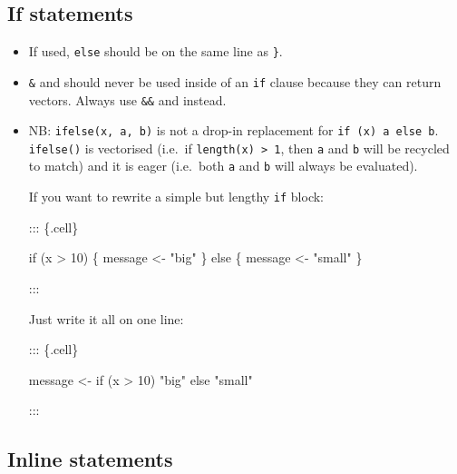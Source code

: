 \documentclass[twoside, pagesize, fontsize=11pt, dvipsnames]{scrreport} %
\newenvironment{Shaded}{\begin{snugshade}}{\end{snugshade}}
\newcommand{\ControlFlowTok}[1]{\textcolor[rgb]{0.00,0.23,0.31}{#1}}
\newcommand{\DecValTok}[1]{\textcolor[rgb]{0.68,0.00,0.00}{#1}}
\newcommand{\NormalTok}[1]{\textcolor[rgb]{0.00,0.23,0.31}{#1}}
\newcommand{\OtherTok}[1]{\textcolor[rgb]{0.00,0.23,0.31}{#1}}
\newcommand{\SpecialCharTok}[1]{\textcolor[rgb]{0.37,0.37,0.37}{#1}}
\newcommand{\StringTok}[1]{\textcolor[rgb]{0.13,0.47,0.30}{#1}}
\begin{document}
\hypertarget{if-statements}{%
\subsection{If statements}\label{if-statements}}

\begin{itemize}
\item
  If used, \texttt{else} should be on the same line as \texttt{\}}.
\item
  \texttt{\&} and \texttt{\textbar{}} should never be used inside of an
  \texttt{if} clause because they can return vectors. Always use
  \texttt{\&\&} and \texttt{\textbar{}\textbar{}} instead.
\item
  NB: \texttt{ifelse(x,\ a,\ b)} is not a drop-in replacement for
  \texttt{if\ (x)\ a\ else\ b}. \texttt{ifelse()} is vectorised (i.e.~if
  \texttt{length(x)\ \textgreater{}\ 1}, then \texttt{a} and \texttt{b}
  will be recycled to match) and it is eager (i.e.~both \texttt{a} and
  \texttt{b} will always be evaluated).

  If you want to rewrite a simple but lengthy \texttt{if} block:

  ::: \{.cell\}

\begin{Shaded}
\begin{Highlighting}[]
\ControlFlowTok{if}\NormalTok{ (x }\SpecialCharTok{\textgreater{}} \DecValTok{10}\NormalTok{) \{}
\NormalTok{  message }\OtherTok{\textless{}{-}} \StringTok{"big"}
\NormalTok{\} }\ControlFlowTok{else}\NormalTok{ \{}
\NormalTok{  message }\OtherTok{\textless{}{-}} \StringTok{"small"}
\NormalTok{\}}
\end{Highlighting}
\end{Shaded}

  :::

  Just write it all on one line:

  ::: \{.cell\}

\begin{Shaded}
\begin{Highlighting}[]
\NormalTok{message }\OtherTok{\textless{}{-}} \ControlFlowTok{if}\NormalTok{ (x }\SpecialCharTok{\textgreater{}} \DecValTok{10}\NormalTok{) }\StringTok{"big"} \ControlFlowTok{else} \StringTok{"small"}
\end{Highlighting}
\end{Shaded}

  :::
\end{itemize}

\hypertarget{inline-statements}{%
\subsection{Inline statements}\label{inline-statements}}
\end{document}
